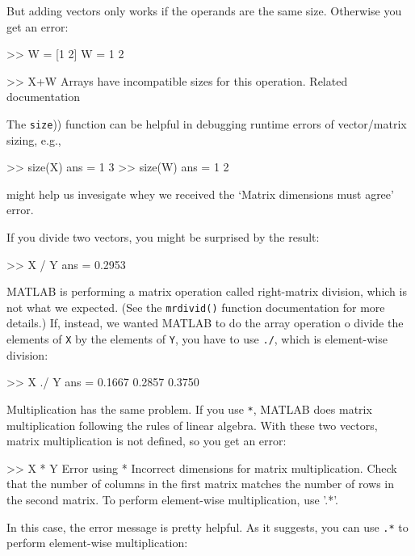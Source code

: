 But adding vectors only works if the operands are the same size.
Otherwise you get an error:

\begin{code}
>> W = [1 2]
W = 1     2

>> X+W
Arrays have incompatible sizes for this operation.
Related documentation 
\end{code}

The \lstinline(size()) function can be helpful in debugging runtime errors of vector/matrix sizing, e.g.,
\begin{code}
    >> size(X)
    ans =
         1     3
    >> size(W)
    ans =
         1     2
\end{code}
might help us invesigate whey we received the `Matrix dimensions must agree' error.


If you divide two vectors, you might be surprised by the result:

\begin{code}
>> X / Y
ans = 0.2953
\end{code}

MATLAB is performing a matrix operation called right-matrix division, which is not what we expected.  (See the \lstinline{mrdivid()} function documentation for more details.)
If, instead, we wanted MATLAB to do the array operation o divide the elements of \lstinline{X} by the elements of \lstinline{Y}, you have to use \lstinline{./}, which is element-wise division:

\begin{code}
>> X ./ Y
ans = 0.1667    0.2857    0.3750
\end{code}

Multiplication has the same problem.  If you use \lstinline{*}, MATLAB does matrix multiplication following the rules of linear algebra.  With these two vectors, matrix multiplication is not defined, so you get an error:

\begin{code}
>> X * Y
Error using  *
Incorrect dimensions for matrix multiplication.
Check that the number of columns in the first matrix
matches the number of rows in the second matrix.
To perform element-wise multiplication, use '.*'.
\end{code}

In this case, the error message is pretty helpful.  As it suggests, you can use \lstinline{.*} to perform element-wise multiplication:

